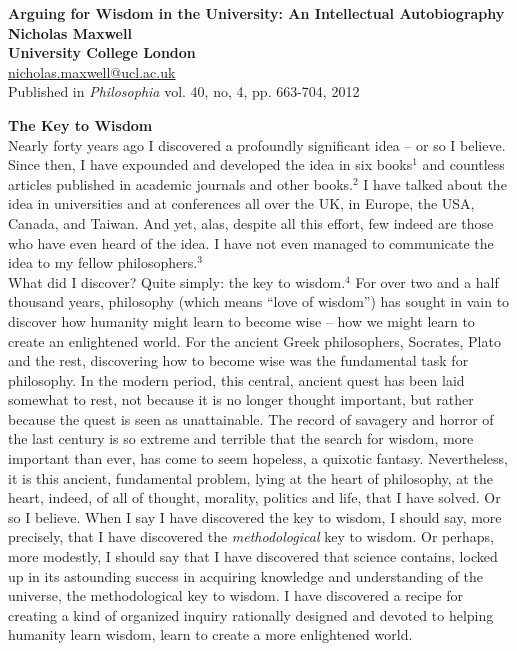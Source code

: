 \documentclass[12pt]{article}
\begin{document}
\noindent\textbf{Arguing for Wisdom in the University: An Intellectual Autobiography \\
Nicholas Maxwell \\
University College London \\}
\href{mailto:nicholas.maxwell@ucl.ac.uk}{\underline{nicholas.maxwell@ucl.ac.uk}} \\
Published in \textit{Philosophia} vol. 40, no, 4, pp. 663-704, 2012
\begin{flushleft}
\textbf{The Key to Wisdom} \\
\hspace{10pt}Nearly forty years ago I discovered a profoundly significant idea – or so I believe. Since then, I have expounded and developed the idea in six books$^{1}$ and countless articles published in academic journals and other books.$^{2}$ I have talked about the idea in universities and at conferences all over the UK, in Europe, the USA, Canada, and Taiwan. And yet, alas, despite all this effort, few indeed are those who have even heard of the idea. I have not even managed to communicate the idea to my fellow philosophers.$^{3}$ \\
\hspace{10pt}What did I discover? Quite simply: the key to wisdom.$^{4}$ For over two and a half thousand years, philosophy (which means “love of wisdom”) has sought in vain to discover how humanity might learn to become wise – how we might learn to create an enlightened world. For the ancient Greek philosophers, Socrates, Plato and the rest, discovering how to become wise was the fundamental task for philosophy. In the modern period, this central, ancient quest has been laid somewhat to rest, not because it is no longer thought important, but rather because the quest is seen as unattainable. The record of savagery and horror of the last century is so extreme and terrible that the search for wisdom, more important than ever, has come to seem hopeless, a quixotic fantasy. Nevertheless, it is this ancient, fundamental problem, lying at the heart of philosophy, at the heart, indeed, of all of thought, morality, politics and life, that I have solved. Or so I believe.
\hspace{10pt}When I say I have discovered the key to wisdom, I should say, more precisely, that I have discovered the \textit{methodological} key to wisdom. Or perhaps, more modestly, I should say that I have discovered that science contains, locked up in its astounding success in acquiring knowledge and understanding of the universe, the methodological key to wisdom. I have discovered a recipe for creating a kind of organized inquiry rationally designed and devoted to helping humanity learn wisdom, learn to create a more enlightened world.\\

\end{flushleft}
\end{document}

